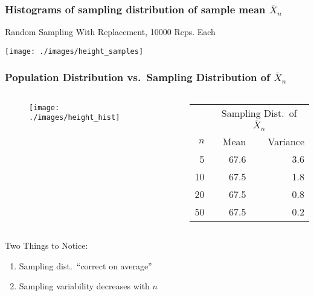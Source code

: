 \documentclass{beamer}
\begin{document}
\begin{frame}
\frametitle{Histograms of sampling distribution of sample mean $\bar{X}_n$}
\alert{Random Sampling With Replacement, 10000 Reps. Each}
\begin{center}
\texttt{[image: ./images/height\_samples]}
\end{center}
\end{frame}
\begin{frame}
\frametitle{Population Distribution vs.\ Sampling Distribution of $\bar{X}_n$}

\begin{columns} 
\begin{column}[c]{6cm} 

\begin{figure}
\centering
\texttt{[image: ./images/height\_hist]}
\end{figure}
\end{column} 
\begin{column}[c]{6cm} 

 \small
\begin{table}
\begin{tabular}{|rrr|}
\hline
&\multicolumn{2}{c|}{Sampling Dist.\ of $\bar{X}_n$}\\
$n$&Mean&Variance\\
\hline
5&67.6&3.6\\
10&67.5&1.8\\
20&67.5&0.8\\
50&67.5&0.2\\
\hline
\end{tabular}
\end{table}

\end{column} 
\end{columns} 
\begin{alertblock}{Two Things to Notice:}
\begin{enumerate}
	\item Sampling dist.\ ``correct on average'' 
	\item Sampling variability decreases with $n$
\end{enumerate}
\end{alertblock}
\end{frame}
\end{document}
